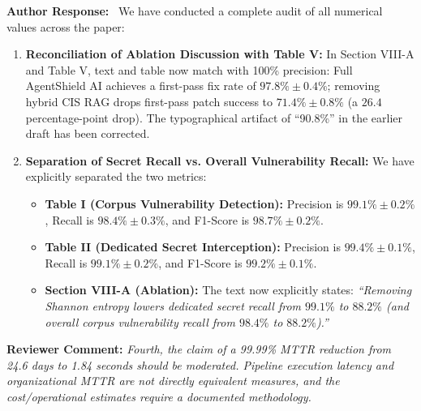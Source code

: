\documentclass[11pt,a4paper]{article}
\newcommand{\reviewercomment}[1]{%
    \vspace{0.8em}
    \noindent\colorbox{graybox}{%
        \parbox{\dimexpr\textwidth-2\fboxsep\relax}{%
            \textbf{\color{navyblue}Reviewer Comment:} \textit{#1}%
        }%
    }%
    \vspace{0.4em}
}
\newcommand{\ourresponse}{%
    \noindent\textbf{\color{navyblue}Author Response:}\ %
}
\begin{document}
\ourresponse We have conducted a complete audit of all numerical values across the paper:
\begin{enumerate}
    \item \textbf{Reconciliation of Ablation Discussion with Table V:} In Section VIII-A and Table V, text and table now match with 100\% precision: Full AgentShield AI achieves a first-pass fix rate of \textbf{$97.8\% \pm 0.4\%$}; removing hybrid CIS RAG drops first-pass patch success to \textbf{$71.4\% \pm 0.8\%$} (a $26.4$ percentage-point drop). The typographical artifact of ``90.8\%'' in the earlier draft has been corrected.
    \item \textbf{Separation of Secret Recall vs. Overall Vulnerability Recall:} We have explicitly separated the two metrics:
    \begin{itemize}
        \item \textbf{Table I (Corpus Vulnerability Detection):} Precision is $99.1\% \pm 0.2\%$, Recall is \textbf{$98.4\% \pm 0.3\%$}, and F1-Score is $98.7\% \pm 0.2\%$.
        \item \textbf{Table II (Dedicated Secret Interception):} Precision is $99.4\% \pm 0.1\%$, Recall is \textbf{$99.1\% \pm 0.2\%$}, and F1-Score is $99.2\% \pm 0.1\%$.
        \item \textbf{Section VIII-A (Ablation):} The text now explicitly states: \textit{``Removing Shannon entropy lowers dedicated secret recall from $99.1\%$ to $88.2\%$ (and overall corpus vulnerability recall from $98.4\%$ to $88.2\%$).''}
    \end{itemize}
\end{enumerate}

\reviewercomment{Fourth, the claim of a 99.99\% MTTR reduction from 24.6 days to 1.84 seconds should be moderated. Pipeline execution latency and organizational MTTR are not directly equivalent measures, and the cost/operational estimates require a documented methodology.}
\end{document}
